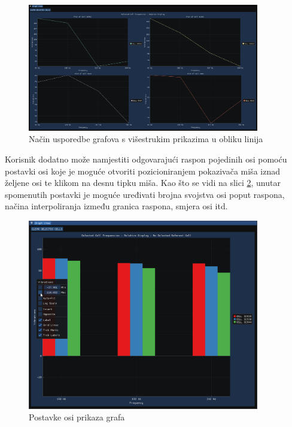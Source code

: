 \documentclass[times, utf8, diplomski]{fer}
\begin{document}
\begin{figure}[H]
	\centering
	\includegraphics[width=0.9\textwidth]{subplots_graph_display_lines.png}
	\caption{Način usporedbe grafova s višestrukim prikazima u obliku linija}
    \label{fig:subplots_graph_display_lines}
\end{figure}

Korisnik dodatno može namjestiti odgovarajući raspon pojedinih osi pomoću postavki osi koje je moguće otvoriti pozicioniranjem pokazivača miša iznad željene osi te klikom na desnu tipku miša. Kao što se vidi na slici \ref{fig:graph-axis-settings}, unutar spomenutih postavki je moguće uređivati brojna svojstva osi poput raspona, načina interpoliranja između granica raspona, smjera osi itd.

\begin{figure} [H]
	\centering
    \includegraphics[width=0.9\textwidth]{graph_view_axis_settings.png}
    \caption{Postavke osi prikaza grafa}
    \label{fig:graph-axis-settings}
\end{figure}
\end{document}
